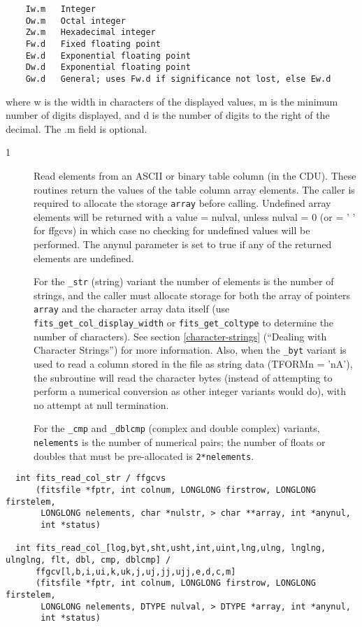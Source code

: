 \documentclass[11pt]{book}
\begin{document}
\begin{verbatim}
    Iw.m   Integer
    Ow.m   Octal integer
    Zw.m   Hexadecimal integer
    Fw.d   Fixed floating point
    Ew.d   Exponential floating point
    Dw.d   Exponential floating point
    Gw.d   General; uses Fw.d if significance not lost, else Ew.d
\end{verbatim}
    where w is the width in characters of the displayed values, m is
    the minimum number of digits displayed, and d is the number of
    digits to the right of the decimal.  The .m field is optional.


\begin{description}
\item[1 ] Read elements from an ASCII or binary table column (in the CDU).  These
    routines return the values of the table column array elements.  The caller
    is required to allocate the storage \verb+array+ before calling.  Undefined
    array elements will be returned with a value = nulval, unless nulval = 0
    (or = ' ' for ffgcvs) in which case no checking for undefined values will
    be performed. The anynul parameter is set to true if any of the returned
    elements are undefined. 

    For the \verb+_str+ (string) variant the number
    of elements is the number of strings, and the caller must allocate storage
    for both the array of pointers \verb+array+ and the character array data
    itself (use \verb+fits_get_col_display_width+ or \verb+fits_get_coltype+ to 
    determine the number of characters).  See section \ref{character-strings}
    (``Dealing with Character Strings'') for more information.  Also, when
    the \verb+_byt+ variant is used to read a column stored in the file as 
    string data (TFORMn = 'nA'), the subroutine will read the character
    bytes (instead of attempting to perform a numerical conversion as other
    integer variants would do), with no attempt at null termination.

    For the \verb+_cmp+ and \verb+_dblcmp+
    (complex and double complex) variants, \verb+nelements+ is the number
    of numerical pairs; the number of floats or doubles that must be 
    pre-allocated is \verb+2*nelements+.
\label{ffgcvx}
\end{description}

\begin{verbatim}
  int fits_read_col_str / ffgcvs
      (fitsfile *fptr, int colnum, LONGLONG firstrow, LONGLONG firstelem,
       LONGLONG nelements, char *nulstr, > char **array, int *anynul,
       int *status)

  int fits_read_col_[log,byt,sht,usht,int,uint,lng,ulng, lnglng, ulnglng, flt, dbl, cmp, dblcmp] /
      ffgcv[l,b,i,ui,k,uk,j,uj,jj,ujj,e,d,c,m]
      (fitsfile *fptr, int colnum, LONGLONG firstrow, LONGLONG firstelem,
       LONGLONG nelements, DTYPE nulval, > DTYPE *array, int *anynul,
       int *status)
\end{verbatim}
\end{document}
